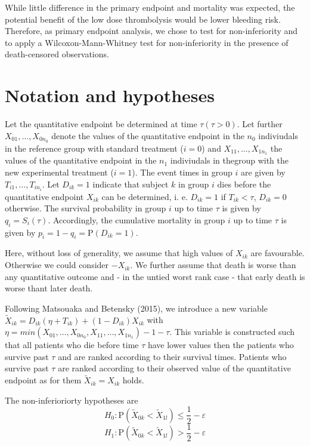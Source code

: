 \documentclass[bimj,fleqn]{w-art}\usepackage[]{graphicx}\usepackage[]{color}
\theoremstyle{plain}
\theoremstyle{definition}
\begin{document}
  While little difference in the primary endpoint and mortality was expected,
  the potential benefit of the low dose thrombolysis would be lower bleeding
  risk. Therefore, as primary endpoint analysis, we chose to test for
  non-inferiority and to apply a Wilcoxon-Mann-Whitney test for non-inferiority
  in the presence of death-censored observations.

  \section{Notation and hypotheses}
  \label{sec:Notation}
  Let the quantitative endpoint be determined at time $\tau (\tau > 0)$. Let
  further $X_{01}, \ldots, X_{0n_0}$ denote the values of the quantitative endpoint
  in the $n_0$ indiviudals in the reference group with standard treatment ($i=0$)
  and $X_{11}, \ldots, X_{1n_1}$ the values of the quantitative endpoint in the
  $n_1$ indiviudals in thegroup with the new experimental treatment ($i=1$).
  The event times in group $i$ are given by $T_{i1}, \ldots, T_{in_i}$. Let
  $D_{ik} = 1$ indicate that subject $k$ in group $i$ dies before the
  quantitative endpoint $X_{ik}$ can be determined, i. e. $D_{ik} = 1$ if
  $T_{ik} < \tau $, $D_{ik} = 0$ otherwise. The survival probability in group
  $i$ up to time $\tau$ is given by $q_i = S_i(\tau)$. Accordingly, the
  cumulative mortality in group $i$ up to time $\tau$ is given by
  $p_i = 1 - q_i = \text{P}(D_{ik} = 1)$.

  Here, without loss of generality, we assume that high values of $X_{ik}$ are
  favourable. Otherwise we could consider $-X_{ik}$. We further assume that
  death is worse than any quantitative outcome and - in the untied worst rank
  case - that early death is worse thant later death.

  Following Matsouaka and Betensky (2015), we introduce a new variable
  $\widetilde{X}_{ik} = D_{ik}(\eta  + T_{ik}) + (1 - D_{ik})X_{ik}$ with
	$\eta = min(X_{01}, \ldots, X_{0n_0}, X_{11}, \ldots, X_{1n_1}) - 1 - \tau$.
	This variable is constructed such that all patients who die before time $\tau$
	have lower values then the patients who survive past $\tau$ and are ranked
	according to their survival times. Patients who survive past $\tau$ are ranked
	according to their observed	value of the quantitative endpoint as for them
	$\widetilde{X}_{ik} = {X}_{ik}$ holds.

	The non-inferioriorty hypotheses are
	$$ H_0: \text{P}(\widetilde{X}_{0k} < \widetilde{X}_{1l})
          \leq \frac{1}{2} - \varepsilon $$
  $$ H_1: \text{P}(\widetilde{X}_{0k} < \widetilde{X}_{1l})
          > \frac{1}{2} - \varepsilon    $$
\end{document}
